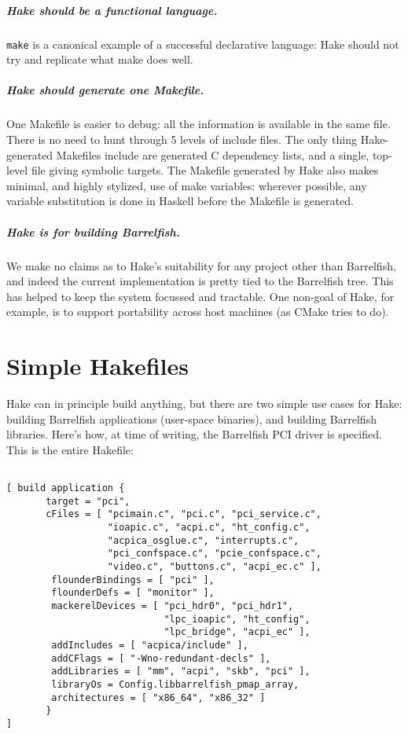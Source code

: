 \documentclass[a4paper,twoside]{report} %
\begin{document}
\paragraph{Hake should be a functional language.}  \texttt{make} is a
canonical example of a successful declarative language: Hake should
not try and replicate what make does well.

\paragraph{Hake should generate one Makefile.} One Makefile is easier
to debug: all the information is available in the same file.  There is
no need to hunt through 5 levels of include files.  The only thing
Hake-generated Makefiles include are generated C dependency lists, and
a single, top-level file giving symbolic targets.  The Makefile
generated by Hake also makes minimal, and highly stylized, use of make
variables: wherever possible, any variable substitution is done in Haskell
before the Makefile is generated.

\paragraph{Hake is for building Barrelfish.}  We make no claims as to
Hake's suitability for any project other than Barrelfish, and indeed
the current implementation is pretty tied to the Barrelfish tree.
This has helped to keep the system focussed and tractable.  One
non-goal of Hake, for example, is to support portability across host
machines (as CMake tries to do).

\chapter{Simple Hakefiles}

Hake can in principle build anything, but there are two simple use
cases for Hake: building Barrelfish applications (user-space
binaries), and building Barrelfish libraries.  Here's how, at time of
writing, the Barrelfish PCI driver is specified.  This is the entire
Hakefile:

\begin{verbatim}

[ build application {
       target = "pci",
       cFiles = [ "pcimain.c", "pci.c", "pci_service.c",
                  "ioapic.c", "acpi.c", "ht_config.c",
                  "acpica_osglue.c", "interrupts.c",
                  "pci_confspace.c", "pcie_confspace.c",
                  "video.c", "buttons.c", "acpi_ec.c" ],
        flounderBindings = [ "pci" ],
        flounderDefs = [ "monitor" ],
        mackerelDevices = [ "pci_hdr0", "pci_hdr1",
                            "lpc_ioapic", "ht_config",
                            "lpc_bridge", "acpi_ec" ],
        addIncludes = [ "acpica/include" ],
        addCFlags = [ "-Wno-redundant-decls" ],
        addLibraries = [ "mm", "acpi", "skb", "pci" ],
        libraryOs = Config.libbarrelfish_pmap_array,
        architectures = [ "x86_64", "x86_32" ]
       }
]
\end{verbatim}
\end{document}

